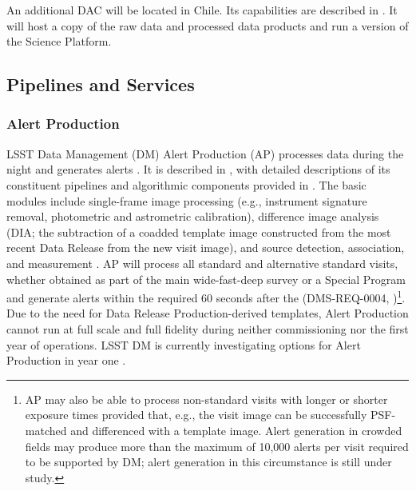 An additional DAC will be located in Chile.
Its capabilities are described in .
It will host a copy of the raw data and processed data products and run a version of the Science Platform.

\subsection{Pipelines and Services}

\subsubsection{Alert Production}\label{sec:AP}

LSST Data Management (DM) Alert Production (AP) processes data during the night and generates alerts .
It is described in , with detailed descriptions of its constituent pipelines and algorithmic components provided in .
The basic modules include single-frame image processing (e.g., instrument signature removal, photometric and astrometric calibration), difference image analysis (DIA; the subtraction of a coadded template image constructed from the most recent Data Release from the new visit image), and source detection, association, and measurement .
AP will process all standard and alternative standard visits, whether obtained as part of the main wide-fast-deep survey or a Special Program  and generate alerts within the required 60 seconds after the  (DMS-REQ-0004, )\footnote{
AP may also be able to process non-standard visits with longer or shorter exposure times provided that, e.g., the visit image can be successfully PSF-matched and differenced with a template image.
Alert generation in crowded fields may produce more than the maximum of 10,000 alerts per visit required to be supported by DM; alert generation in this circumstance is still under study.
}.
Due to the need for Data Release Production-derived templates, Alert Production cannot run at full scale and full fidelity during neither commissioning nor the first year of operations.  LSST DM is currently investigating options for Alert Production in year one .

